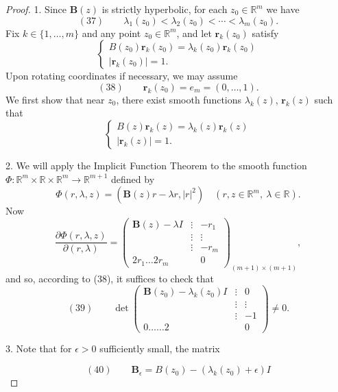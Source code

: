 \begin{proof}
1. Since $\mathbf{B}(z)$ is strictly hyperbolic, for each $z_0\in\mathbb{R}^m$ we have
$$(37) \qquad \lambda_1(z_0) < \lambda_2(z_0) < \cdots < \lambda_m(z_0).$$
Fix $k\in\{1,\ldots,m\}$ and any point $z_0\in\mathbb{R}^m$, and let $\mathbf{r}_k(z_0)$ satisfy
$$\begin{cases} B(z_0)\mathbf{r}_k(z_0) = \lambda_k(z_0)\mathbf{r}_k(z_0) \\ |\mathbf{r}_k(z_0)| = 1. \end{cases}$$
Upon rotating coordinates if necessary, we may assume
$$(38) \qquad \mathbf{r}_k(z_0) = e_m = (0,\ldots,1).$$
We first show that near $z_0$, there exist smooth functions $\lambda_k(z)$, $\mathbf{r}_k(z)$ such that
$$\begin{cases} B(z)\mathbf{r}_k(z) = \lambda_k(z)\mathbf{r}_k(z) \\ |\mathbf{r}_k(z)| = 1. \end{cases}$$

2. We will apply the Implicit Function Theorem to the smooth function $\Phi:\mathbb{R}^m\times\mathbb{R}\times\mathbb{R}^m\to\mathbb{R}^{m+1}$ defined by
$$\Phi(r,\lambda,z) = (\mathbf{B}(z)r - \lambda r, |r|^2) \quad (r,z\in\mathbb{R}^m,\ \lambda\in\mathbb{R}).$$
Now
$$\frac{\partial\Phi(r,\lambda,z)}{\partial(r,\lambda)} = \begin{pmatrix} \mathbf{B}(z)-\lambda I & \vdots & -r_1 \\ & \vdots & \vdots \\ & \vdots & -r_m \\ 2r_1 \ldots 2r_m & & 0 \end{pmatrix}_{(m+1)\times(m+1)},$$
and so, according to (38), it suffices to check that
$$(39) \qquad \det\begin{pmatrix} \mathbf{B}(z_0)-\lambda_k(z_0)I & \vdots & 0 \\ & \vdots & \vdots \\ & \vdots & -1 \\ 0\ldots\ldots 2 & & 0 \end{pmatrix} \neq 0.$$

3. Note that for $\epsilon>0$ sufficiently small, the matrix

$$(40) \qquad \mathbf{B}_\epsilon = B(z_0) - (\lambda_k(z_0)+\epsilon)I$$


\end{proof}
